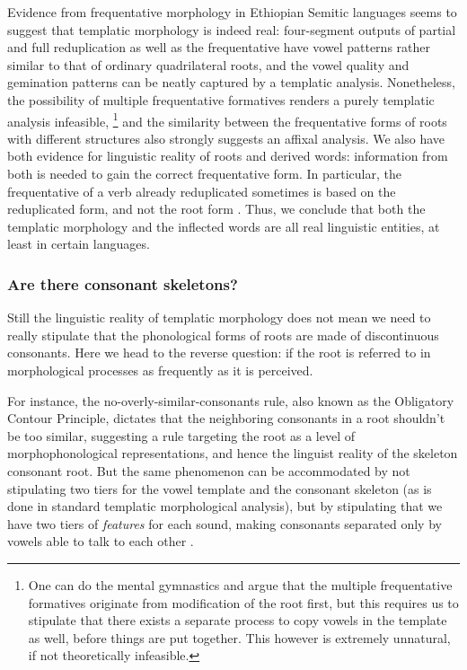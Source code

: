 \documentclass[a4paper, oneside, 12pt]{report}
\begin{document}
Evidence from frequentative morphology in Ethiopian Semitic languages
seems to suggest that templatic morphology is indeed real:
four-segment outputs of partial and full reduplication as well as the frequentative
have vowel patterns rather similar to that of ordinary quadrilateral roots,
and the vowel quality and gemination patterns can be neatly captured by a templatic analysis.
Nonetheless, the possibility of multiple frequentative formatives renders 
a purely templatic analysis infeasible,%
\footnote{
    One can do the mental gymnastics and argue that the multiple frequentative formatives
    originate from modification of the root first,
    but this requires us to stipulate that there exists a separate process
    to copy vowels in the template as well,
    before things are put together.
    This however is extremely unnatural, if not theoretically infeasible.
}
and the similarity between the frequentative forms of roots with different structures
also strongly suggests an affixal analysis.
We also have both evidence for linguistic reality of roots and derived words:
information from both is needed to gain the correct frequentative form.
In particular, the frequentative of a verb already reduplicated 
sometimes is based on the reduplicated form, and not the root form
\citep{rose2008formation}.
Thus, we conclude that both the templatic morphology
and the inflected words are all real linguistic entities,
at least in certain languages.

\subsubsection{Are there consonant skeletons?}

Still the linguistic reality of templatic morphology
does not mean we need to really stipulate that the phonological forms of roots
are made of discontinuous consonants.
Here we head to the reverse question: if the root is referred to in morphological processes
as frequently as it is perceived.

For instance, the no-overly-similar-consonants rule,
also known as the Obligatory Contour Principle,
dictates that the neighboring consonants in a root shouldn't be too similar,
suggesting a rule targeting the root as a level of morphophonological representations,
and hence the linguist reality of the skeleton consonant root.
But the same phenomenon can be accommodated by
not stipulating two tiers for the vowel template and the consonant skeleton
(as is done in standard templatic morphological analysis),
but by stipulating that we have two tiers of \emph{features} for each sound,
making consonants separated only by vowels able to talk to each other \citep{bat20082}. 
\end{document}
